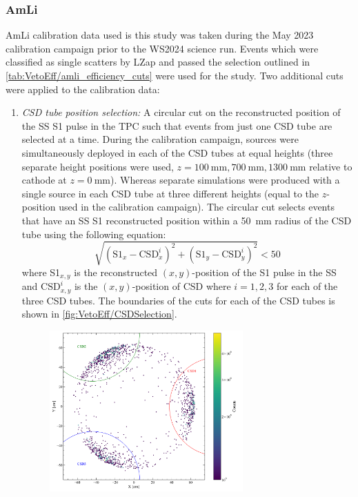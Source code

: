 \subsubsection{AmLi}\label{sec:VetoEff/AmLi_Efficiency}
AmLi calibration data used is this study was taken during the May 2023 calibration campaign prior to the WS2024 science run. Events which were classified as single scatters by LZap and passed the selection outlined in \autoref{tab:VetoEff/amli_efficiency_cuts} were used for the study. Two additional cuts were applied to the calibration data:
\begin{enumerate}
	\item \textit{CSD tube position selection:} A circular cut on the reconstructed position of the SS S1 pulse in the TPC such that events from just one CSD tube are selected at a time. During the calibration campaign, sources were simultaneously deployed in each of the CSD tubes at equal heights (three separate height positions were used, $z=100~\text{mm},700~\text{mm},1300~\text{mm}$ relative to cathode at $z=0~\text{mm}$). Whereas separate simulations were produced with a single source in each CSD tube at three different heights (equal to the $z$-position used in the calibration campaign). 
    The circular cut selects events that have an SS S1 reconstructed position within a 50~mm radius of the CSD tube using the following equation:
    \begin{equation}\label{eqn:VetoEff/CSDSelection}
        \sqrt{(\text{S1}_x-\text{CSD}_x^i)^2+(\text{S1}_y-\text{CSD}_y^i)^2}<50
    \end{equation}
    where S1$_{x,y}$ is the reconstructed $(x,y)$-position of the S1 pulse in the SS and $\text{CSD}_{x,y}^i$ is the $(x,y)$-position of CSD where $i=1,2,3$ for each of the three CSD tubes.
    The boundaries of the cuts for each of the CSD tubes is shown in \autoref{fig:VetoEff/CSDSelection}. 
    \begin{figure}[!ht]
    \centering
        \includegraphics[width=0.7\textwidth]{figures/VetoEfficiency/CircularCSDCut.pdf}

\end{figure}
\end{enumerate}

